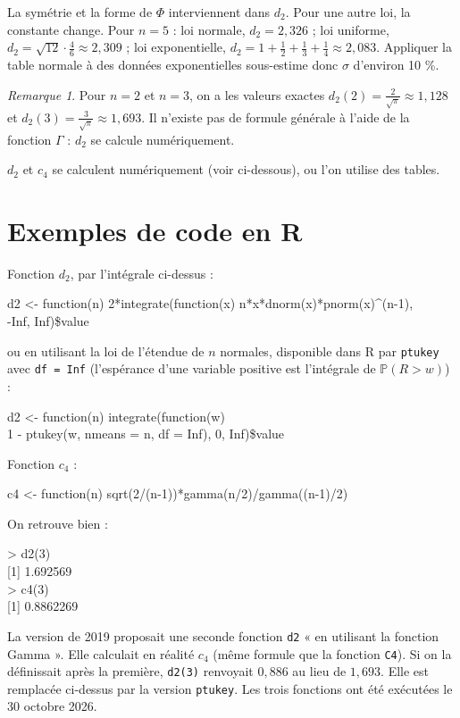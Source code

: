 \documentclass[11pt,a4paper]{article}
\theoremstyle{sj}
\theoremstyle{remark}
\newtheorem*{rem}{Remarque}
\renewcommand{\P}{\mathbb{P}}
\begin{document}
\begin{note}
La symétrie et la forme de $\Phi$ interviennent dans $d_2$. Pour une autre loi, la constante change. Pour $n=5$ : loi normale, $d_2=2{,}326$ ; loi uniforme, $d_2=\sqrt{12}\cdot\frac46\approx2{,}309$ ; loi exponentielle, $d_2=1+\frac12+\frac13+\frac14\approx2{,}083$. Appliquer la table normale à des données exponentielles sous-estime donc $\sigma$ d'environ 10 \%.
\end{note}

\begin{rem}
Pour $n=2$ et $n=3$, on a les valeurs exactes $d_2(2)=\frac{2}{\sqrt\pi}\approx1{,}128$ et $d_2(3)=\frac{3}{\sqrt\pi}\approx1{,}693$. Il n'existe pas de formule générale à l'aide de la fonction $\Gamma$ : $d_2$ se calcule numériquement.
\end{rem}

$d_2$ et $c_4$ se calculent numériquement (voir ci-dessous), ou l'on utilise des tables.

\section*{Exemples de code en R}

Fonction $d_2$, par l'intégrale ci-dessus :
\begin{code}
d2 <- function(n) 2*integrate(function(x) n*x*dnorm(x)*pnorm(x)\^{}(n-1),\\
\phantom{d2 <- function(n) 2*integrate(}-Inf, Inf)\$value
\end{code}
ou en utilisant la loi de l'étendue de $n$ normales, disponible dans R par \texttt{ptukey} avec \mbox{\texttt{df = Inf}} (l'espérance d'une variable positive est l'intégrale de $\P(R>w)$) :
\begin{code}
d2 <- function(n) integrate(function(w)\\
\phantom{d2 <- }1 - ptukey(w, nmeans = n, df = Inf), 0, Inf)\$value
\end{code}
Fonction $c_4$ :
\begin{code}
c4 <- function(n) sqrt(2/(n-1))*gamma(n/2)/gamma((n-1)/2)
\end{code}
On retrouve bien :
\begin{code}
> d2(3)\\
{[1]} 1.692569\\
> c4(3)\\
{[1]} 0.8862269
\end{code}

\begin{note}
La version de 2019 proposait une seconde fonction \texttt{d2} « en utilisant la fonction Gamma ». Elle calculait en réalité $c_4$ (même formule que la fonction \texttt{C4}). Si on la définissait après la première, \texttt{d2(3)} renvoyait $0{,}886$ au lieu de $1{,}693$. Elle est remplacée ci-dessus par la version \texttt{ptukey}. Les trois fonctions ont été exécutées le 30 octobre 2026.
\end{note}
\end{document}
